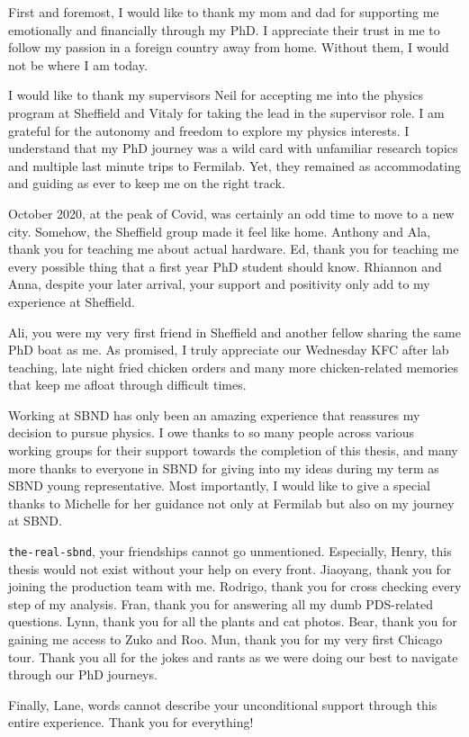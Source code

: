 
\begin{acknowledgements}     
First and foremost, I would like to thank my mom and dad for supporting me emotionally and financially through my PhD.
I appreciate their trust in me to follow my passion in a foreign country away from home.
Without them, I would not be where I am today.

I would like to thank my supervisors Neil for accepting me into the physics program at Sheffield and Vitaly for taking the lead in the supervisor role.
I am grateful for the autonomy and freedom to explore my physics interests.
I understand that my PhD journey was a wild card with unfamiliar research topics and multiple last minute trips to Fermilab. 
Yet, they remained as accommodating and guiding as ever to keep me on the right track.

October 2020, at the peak of Covid, was certainly an odd time to move to a new city.
Somehow, the Sheffield group made it feel like home.                                  
Anthony and Ala, thank you for teaching me about actual hardware.
Ed, thank you for teaching me every possible thing that a first year PhD student should know.
Rhiannon and Anna, despite your later arrival, your support and positivity only add to my experience at Sheffield.

Ali, you were my very first friend in Sheffield and another fellow sharing the same PhD boat as me.   
As promised, I truly appreciate our Wednesday KFC after lab teaching, late night fried chicken orders and many more chicken-related memories that keep me afloat through difficult times.
                                                                                                                            
Working at SBND has only been an amazing experience that reassures my decision to pursue physics.
I owe thanks to so many people across various working groups for their support towards the completion of this thesis, and many more thanks to everyone in SBND for giving into my ideas during my term as SBND young representative.
Most importantly, I would like to give a special thanks to Michelle for her guidance not only at Fermilab but also on my journey at SBND.

\texttt{the-real-sbnd}, your friendships cannot go unmentioned.
Especially, Henry, this thesis would not exist without your help on every front.
Jiaoyang, thank you for joining the production team with me.
Rodrigo, thank you for cross checking every step of my analysis.
Fran, thank you for answering all my dumb PDS-related questions.
Lynn, thank you for all the plants and cat photos.
Bear, thank you for gaining me access to Zuko and Roo.
Mun, thank you for my very first Chicago tour.
Thank you all for the jokes and rants as we were doing our best to navigate through our PhD journeys.

Finally, Lane, words cannot describe your unconditional support through this entire experience.
Thank you for everything!                                                                                                                                       
\end{acknowledgements}

